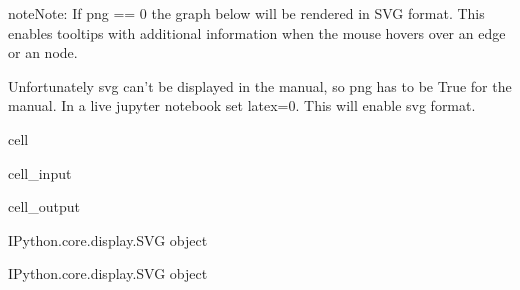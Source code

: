\documentclass[letterpaper,10pt,english]{jupyterBook}
\begin{document}
\begin{sphinxadmonition}{note}{Note:}
\sphinxAtStartPar
If png == 0 the graph below will be rendered in SVG format. This enables tooltips with additional information when the mouse hovers
over an edge or an node.

\sphinxAtStartPar
Unfortunately svg can’t be displayed in the manual, so png has to be True for the manual. In a live jupyter notebook set latex=0. This will
enable svg format.
\end{sphinxadmonition}

\begin{sphinxuseclass}{cell}\begin{sphinxVerbatimInput}

\begin{sphinxuseclass}{cell_input}
\begin{sphinxVerbatim}[commandchars=\\\{\}]
\PYG{p}{[}\PYG{p}{]}  
\end{sphinxVerbatim}

\end{sphinxuseclass}\end{sphinxVerbatimInput}
\begin{sphinxVerbatimOutput}

\begin{sphinxuseclass}{cell_output}
\begin{sphinxVerbatim}[commandchars=\\\{\}]
\PYGZlt{}IPython.core.display.SVG object\PYGZgt{}
\end{sphinxVerbatim}

\begin{sphinxVerbatim}[commandchars=\\\{\}]
\PYGZlt{}IPython.core.display.SVG object\PYGZgt{}
\end{sphinxVerbatim}

\end{sphinxuseclass}\end{sphinxVerbatimOutput}

\end{sphinxuseclass}
\end{document}
